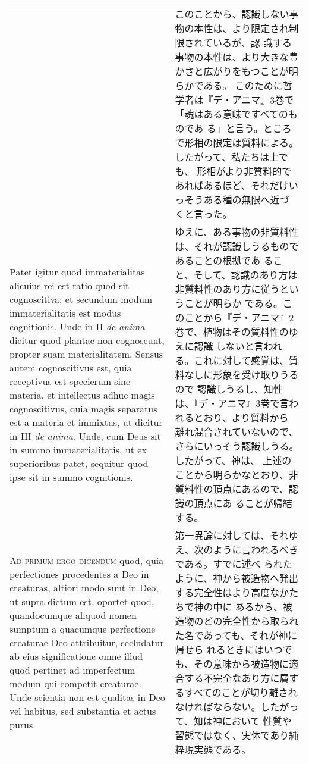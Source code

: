\documentclass[10pt]{jsarticle} %
\begin{document}
\begin{longtable}{p{21em}p{21em}}
&

このことから、認識しない事物の本性は、より限定され制限されているが、認
識する事物の本性は、より大きな豊かさと広がりをもつことが明らかである。
このために哲学者は『デ・アニマ』3巻で「魂はある意味ですべてのものであ
る」と言う。ところで形相の限定は質料による。したがって、私たちは上でも、
形相がより非質料的であればあるほど、それだけいっそうある種の無限へ近づ
くと言った。


\\

Patet igitur quod immaterialitas alicuius rei est ratio quod sit
cognoscitiva; et secundum modum immaterialitatis est modus
cognitionis. Unde in II {\itshape de anima} dicitur quod plantae non
cognoscunt, propter suam materialitatem. Sensus autem cognoscitivus
est, quia receptivus est specierum sine materia, et intellectus adhuc
magis cognoscitivus, quia magis separatus est a materia et immixtus,
ut dicitur in III {\itshape de anima}. Unde, cum Deus sit in summo
immaterialitatis, ut ex superioribus patet, sequitur quod ipse sit in
summo cognitionis.

&

ゆえに、ある事物の非質料性は、それが認識しうるものであることの根拠であ
ること、そして、認識のあり方は非質料性のあり方に従うということが明らか
である。このことから『デ・アニマ』2巻で、植物はその質料性のゆえに認識
しないと言われる。これに対して感覚は、質料なしに形象を受け取りうるので
認識しうるし、知性は、『デ・アニマ』3巻で言われるとおり、より質料から
離れ混合されていないので、さらにいっそう認識しうる。したがって、神は、
上述のことから明らかなとおり、非質料性の頂点にあるので、認識の頂点にあ
ることが帰結する。



\\

{\scshape Ad primum ergo dicendum} quod, quia perfectiones procedentes
a Deo in creaturas, altiori modo sunt in Deo, ut supra dictum est,
oportet quod, quandocumque aliquod nomen sumptum a quacumque
perfectione creaturae Deo attribuitur, secludatur ab eius
significatione omne illud quod pertinet ad imperfectum modum qui
competit creaturae. Unde scientia non est qualitas in Deo vel habitus,
sed substantia et actus purus.

&


第一異論に対しては、それゆえ、次のように言われるべきである。すでに述べ
られたように、神から被造物へ発出する完全性はより高度なかたちで神の中に
あるから、被造物のどの完全性から取られた名であっても、それが神に帰せら
れるときにはいつでも、その意味から被造物に適合する不完全なあり方に属す
るすべてのことが切り離されなければならない。したがって、知は神において
性質や習態ではなく、実体であり純粋現実態である。



\end{longtable}
\end{document}

